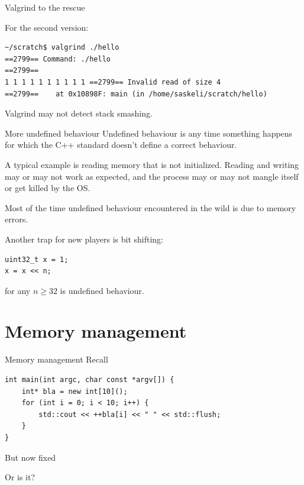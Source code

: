\documentclass[11pt, aspectratio=169, table]{beamer}
\begin{document}
\begin{frame}[fragile]{Valgrind to the rescue}

For the second version:

\begin{verbatim}
~/scratch$ valgrind ./hello
==2799== Command: ./hello
==2799==
1 1 1 1 1 1 1 1 1 1 ==2799== Invalid read of size 4
==2799==    at 0x10898F: main (in /home/saskeli/scratch/hello)
\end{verbatim}

Valgrind may not detect stack smashing.
\end{frame}

\begin{frame}[fragile]{More undefined behaviour}
\setlength\parskip{2pt}
Undefined behaviour is any time something happens for which the C++ standard doesn't define a correct behaviour.

A typical example is reading memory that is not initialized. Reading and writing may or 
may not work as expected, and the process may or may not mangle itself or get killed by the OS.

Most of the time undefined behaviour encountered in the wild is due to memory errors. 

Another trap for new players is bit shifting: 

\vspace{-0.3cm}\begin{verbatim}
uint32_t x = 1;
x = x << n;
\end{verbatim}

\vspace{-0.5cm}for any $n \geq 32$ is undefined behaviour.
\end{frame}

\section{Memory management}
\begin{frame}[fragile]{Memory management}
Recall

\begin{verbatim}
int main(int argc, char const *argv[]) {
    int* bla = new int[10]();
    for (int i = 0; i < 10; i++) {
        std::cout << ++bla[i] << " " << std::flush;
    }
}
\end{verbatim}

But now fixed

\alert{Or is it?}
\end{frame}
\end{document}
